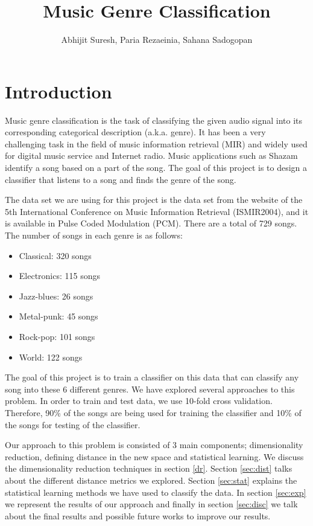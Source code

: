 \documentclass[12pt]{article}
\title{Music Genre Classification}
\author{Abhijit Suresh, Paria Rezaeinia, Sahana Sadogopan}
\begin{document}
	\maketitle

\section{Introduction}
Music genre classification is the task of classifying the given audio signal into its corresponding categorical description (a.k.a. genre). It has been a very challenging task in the field of music information retrieval (MIR) and widely used for digital music service and Internet radio. Music applications such as Shazam identify a song based on a part of the song. The goal of this project is to design a classifier that listens to a song and finds the genre of the song.

The data set we are using for this project is the data set from the website of the 5th International Conference on Music Information Retrieval (ISMIR2004), and it is available in Pulse Coded Modulation (PCM). There are a total of 729 songs. The number of songs in each genre is as follows:
\begin{itemize}
	\item Classical: 320 songs
	\item Electronics: 115 songs
	\item Jazz-blues: 26 songs
	\item Metal-punk: 45 songs
	\item Rock-pop: 101 songs
	\item World: 122 songs
\end{itemize}
The goal of this project is to train a classifier on this data that can classify any song into these 6 different genres. We have explored several approaches to this problem. In order to train and test data, we use 10-fold cross validation. Therefore, 90\% of the songs are being used for training the classifier and 10\% of the songs for testing of the classifier.

Our approach to this problem is consisted of 3 main components; dimensionality reduction, defining distance in the new space and statistical learning. We discuss the dimensionality reduction techniques in section \ref{dr}. Section \ref{sec:dist} talks about the different distance metrics we explored. Section \ref{sec:stat} explains the statistical learning methods we have used to classify the data. In section \ref{sec:exp} we represent the results of our approach and finally in section \ref{sec:disc} we talk about the final results and possible future works to improve our results.
\end{document}
